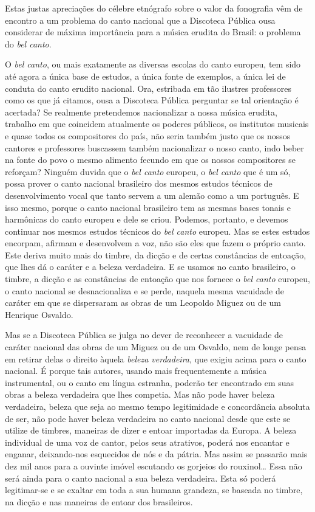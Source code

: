 Estas justas apreciações do célebre etnógrafo sobre o valor da
fonografia vêm de encontro a um problema do canto nacional que a
Discoteca Pública ousa considerar de máxima importância para a música
erudita do Brasil: o problema do \textit{bel canto}.

O \textit{bel canto}, ou mais exatamente as diversas escolas do canto europeu,
tem sido até agora a única base de estudos, a única fonte de exemplos, a
única lei de conduta do canto erudito nacional. Ora, estribada em tão
ilustres professores como os que já citamos, ousa a Discoteca Pública
perguntar se tal orientação é acertada? Se realmente pretendemos
nacionalizar a nossa música erudita, trabalho em que coincidem
atualmente os poderes públicos, os institutos musicais e quase todos os
compositores do país, não seria também justo que os nossos cantores e
professores buscassem também nacionalizar o nosso canto, indo beber na
fonte do povo o mesmo alimento fecundo em que os nossos compositores se
reforçam? Ninguém duvida que o \textit{bel canto} europeu, o \textit{bel canto} que é um
só, possa prover o canto nacional brasileiro dos mesmos estudos técnicos
de desenvolvimento vocal que tanto servem a um alemão como a um
português. E isso mesmo, porque o canto nacional brasileiro tem as
mesmas bases tonais e harmônicas do canto europeu e dele se criou.
Podemos, portanto, e devemos continuar nos mesmos estudos técnicos do
\textit{bel canto} europeu. Mas se estes estudos encorpam, afirmam e desenvolvem
a voz, não são eles que fazem o próprio canto. Este deriva muito mais do
timbre, da dicção e de certas constâncias de entoação, que lhes dá o
caráter e a beleza verdadeira. E se usamos no canto brasileiro, o
timbre, a dicção e as constâncias de entoação que nos fornece o \textit{bel
canto} europeu, o canto nacional se desnacionaliza e se perde, naquela
mesma vacuidade de caráter em que se dispersaram as obras de um Leopoldo
Miguez ou de um Henrique Osvaldo.

Mas se a Discoteca Pública se julga no dever de reconhecer a vacuidade
de caráter nacional das obras de um Miguez ou de um Osvaldo, nem de
longe pensa em retirar delas o direito àquela \textit{beleza verdadeira}, que
exigiu acima para o canto nacional. É porque tais autores, usando mais
frequentemente a música instrumental, ou o canto em língua estranha,
poderão ter encontrado em suas obras a beleza verdadeira que lhes
competia. Mas não pode haver beleza verdadeira, beleza que seja ao mesmo
tempo legitimidade e concordância absoluta de ser, não pode haver beleza
verdadeira no canto nacional desde que este se utilize de timbres,
maneiras de dizer e entoar importadas da Europa. A beleza individual de
uma voz de cantor, pelos seus atrativos, poderá nos encantar e enganar,
deixando-nos esquecidos de nós e da pátria. Mas assim se passarão mais
dez mil anos para a ouvinte imóvel escutando os gorjeios do rouxinol\ldots{}
Essa não será ainda para o canto nacional a sua beleza verdadeira. Esta
só poderá legitimar-se e se exaltar em toda a sua humana grandeza, se
baseada no timbre, na dicção e nas maneiras de entoar dos brasileiros.

